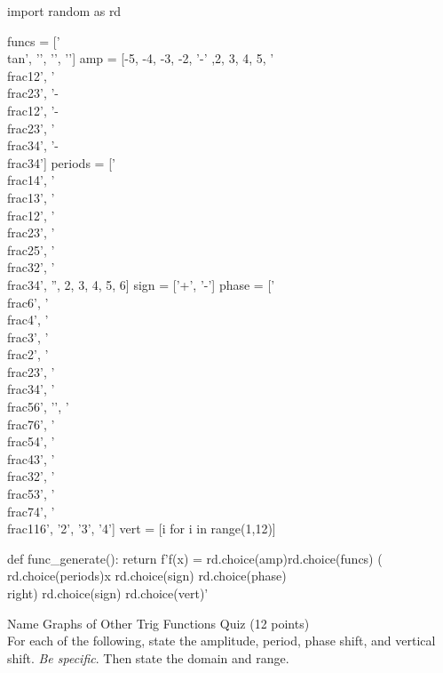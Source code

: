 \documentclass{article}
\begin{document}
\begin{pycode}
import random as rd

funcs = ['\\tan', '\csc', '\cot', '\sec']
amp = [-5, -4, -3, -2, '-' ,2, 3, 4, 5, '\\frac{1}{2}', '\\frac{2}{3}',
'-\\frac{1}{2}', '-\\frac{2}{3}', '\\frac{3}{4}', '-\\frac{3}{4}']
periods = ['\\frac{1}{4}', '\\frac{1}{3}', '\\frac{1}{2}',
    '\\frac{2}{3}', '\\frac{2}{5}', '\\frac{3}{2}', '\\frac{3}{4}',
    '', 2, 3, 4, 5, 6]
sign = ['+', '-']
phase = ['\\frac{\pi}{6}', '\\frac{\pi}{4}', '\\frac{\pi}{3}', '\\frac{\pi}{2}', 
        '\\frac{2\pi}{3}', '\\frac{3\pi}{4}', '\\frac{5\pi}{6}', '\pi', 
        '\\frac{7\pi}{6}', '\\frac{5\pi}{4}', '\\frac{4\pi}{3}', '\\frac{3\pi}{2}', 
        '\\frac{5\pi}{3}', '\\frac{7\pi}{4}', '\\frac{11\pi}{6}', '2\pi', '3\pi',
        '4\pi']
vert = [i for i in range(1,12)]

def func_generate():
    return f'f(x) = {rd.choice(amp)}{rd.choice(funcs)} \left( {rd.choice(periods)}x {rd.choice(sign)} {rd.choice(phase)} \\right) {rd.choice(sign)} {rd.choice(vert)}'

\end{pycode}

Name \makebox[3in]{\hrulefill} \hfill Graphs of Other Trig Functions Quiz (12 points) \newline\\

For each of the following, state the amplitude, period, phase shift, and vertical shift. \emph{Be specific}.
Then state the domain and range.
\end{document}
